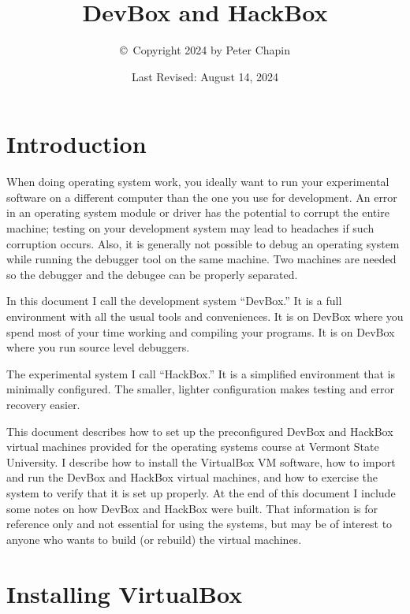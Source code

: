 \documentclass{article}
\begin{document}
\title{DevBox and HackBox}
\author{\copyright\ Copyright 2024 by Peter Chapin}
\date{Last Revised: August 14, 2024}
\maketitle

\tableofcontents

\section{Introduction}

When doing operating system work, you ideally want to run your experimental software on a
different computer than the one you use for development. An error in an operating system module
or driver has the potential to corrupt the entire machine; testing on your development system
may lead to headaches if such corruption occurs. Also, it is generally not possible to debug an
operating system while running the debugger tool on the same machine. Two machines are needed so
the debugger and the debugee can be properly separated.

In this document I call the development system ``DevBox.'' It is a full environment with all the
usual tools and conveniences. It is on DevBox where you spend most of your time working and
compiling your programs. It is on DevBox where you run source level debuggers.

The experimental system I call ``HackBox.'' It is a simplified environment that is minimally
configured. The smaller, lighter configuration makes testing and error recovery easier.

This document describes how to set up the preconfigured DevBox and HackBox virtual machines
provided for the operating systems course at Vermont State University. I describe how to install
the VirtualBox VM software, how to import and run the DevBox and HackBox virtual machines, and
how to exercise the system to verify that it is set up properly. At the end of this document I
include some notes on how DevBox and HackBox were built. That information is for reference only
and not essential for using the systems, but may be of interest to anyone who wants to build (or
rebuild) the virtual machines.

\section{Installing VirtualBox}
\end{document}
